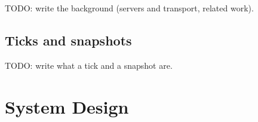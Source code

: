 \documentclass[11pt]{article}
\begin{document}
%
%
TODO: write the background (servers and transport, related work).

\subsection{Ticks and snapshots}
TODO: write what a tick and a snapshot are.

\section{System Design}\label{sec:design}
\end{document}
